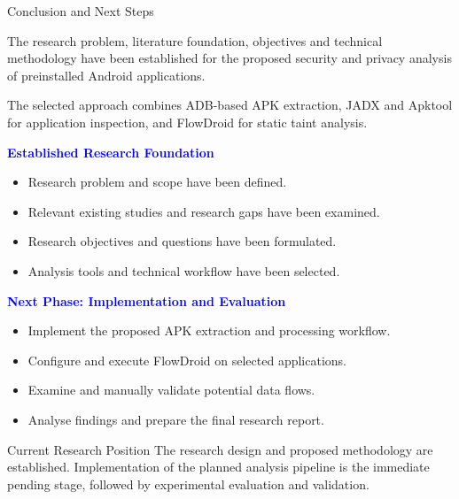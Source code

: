 \documentclass[aspectratio=169,10pt]{beamer}
\newcommand{\hd}[1]{\textbf{\textcolor{blue}{#1}}}
\begin{document}

\begin{frame}{Conclusion and Next Steps}

The research problem, literature foundation, objectives and technical methodology have been established for the proposed security and privacy analysis of preinstalled Android applications.

The selected approach combines ADB-based APK extraction, JADX and Apktool for application inspection, and FlowDroid for static taint analysis.

\vspace{5pt}

\hd{Established Research Foundation}

\begin{itemize}
    \item Research problem and scope have been defined.
    \item Relevant existing studies and research gaps have been examined.
    \item Research objectives and questions have been formulated.
    \item Analysis tools and technical workflow have been selected.
\end{itemize}

\hd{Next Phase: Implementation and Evaluation}

\begin{itemize}
    \item Implement the proposed APK extraction and processing workflow.
    \item Configure and execute FlowDroid on selected applications.
    \item Examine and manually validate potential data flows.
    \item Analyse findings and prepare the final research report.
\end{itemize}

\begin{alertblock}{Current Research Position}
The research design and proposed methodology are established. Implementation of the planned analysis pipeline is the immediate pending stage, followed by experimental evaluation and validation.
\end{alertblock}

\end{frame}

\end{document}
